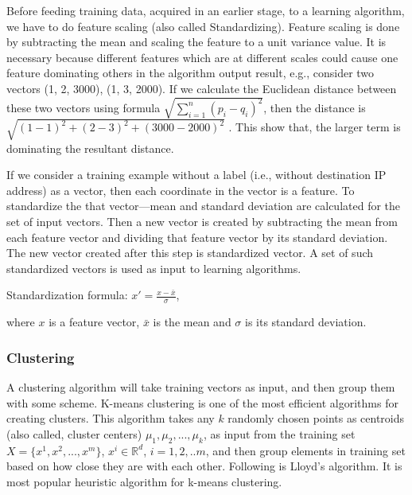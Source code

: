 \documentclass[12pt,oneside,a4paper]{article}
\begin{document}
Before feeding training data, acquired in an earlier stage, to a learning algorithm, we have to do feature scaling (also called Standardizing). Feature scaling is done by subtracting the mean and scaling the feature to a unit variance value. It is necessary because  different features which are at different scales could cause one feature dominating others in the algorithm output result, e.g., consider two vectors (1, 2, 3000), (1, 3, 2000). If we calculate the Euclidean distance between these two vectors using formula $\sqrt{\sum_{i=1}^n (p_i - q_i)^2}$, then the distance is $\sqrt{(1-1)^2 + (2-3)^2 + (3000-2000)^2}$ . This show that, the larger term is dominating the resultant distance.

If we consider a training example without a label (i.e., without destination IP address) as a vector, then each coordinate in the vector is a feature. To standardize the that vector---mean and standard deviation are calculated for the set of input vectors. Then a new vector is created by subtracting the mean from each feature vector and dividing that feature vector by its standard deviation. The new vector created after this step is standardized vector. A set of such standardized vectors is used as input to learning algorithms.

\hspace{2cm} Standardization formula: $x' = \frac{x - \bar{x}}{\sigma}$,

where $x$ is a feature vector, ${\bar{x}}$ is the mean and $\sigma$  is its standard deviation.

\subsubsection{Clustering} \label{subsec:Clustering}

A clustering algorithm will take training vectors as input, and then group them with some scheme. K-means\cite{k-means-clustering} clustering is one of the most efficient algorithms for creating clusters. This algorithm takes any $k$ randomly chosen points as centroids (also called, cluster centers) $\mu_{1}, \mu_{2}, ..., \mu_{k}$, as input from the training set $X = \{x^{1}, x^{2}, ..., x^{m}\}$, $x^{i} \in \mathbb{R}^d$, $i= {1,2, ..m}$, and then group elements in training set based on how close they are with each other. Following is Lloyd's algorithm. It is most popular heuristic algorithm for k-means clustering.
\end{document}
